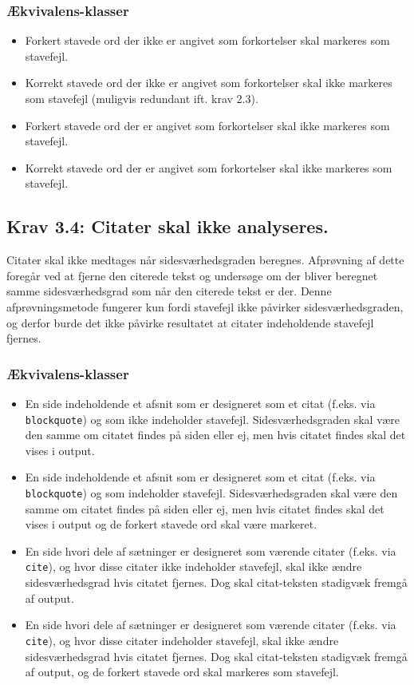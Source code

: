 \documentclass[a4paper,oneside,article]{memoir}
\begin{document}
\begin{landscape}
\subsubsection{Ækvivalens-klasser}
\begin{itemize}
\item Forkert stavede ord der ikke er angivet som forkortelser skal
  markeres som stavefejl.
\item Korrekt stavede ord der ikke er angivet som forkortelser skal
  ikke markeres som stavefejl (muligvis redundant ift. krav 2.3).
\item Forkert stavede ord der er angivet som forkortelser skal ikke
  markeres som stavefejl.
\item Korrekt stavede ord der er angivet som forkortelser skal ikke
  markeres som stavefejl.
\end{itemize}

\subsection{Krav 3.4: Citater skal ikke analyseres.}

Citater skal ikke medtages når sidesværhedsgraden beregnes. Afprøvning
af dette foregår ved at fjerne den citerede tekst og undersøge om der
bliver beregnet samme sidesværhedsgrad som når den citerede tekst er
der. Denne afprøvningsmetode fungerer kun fordi stavefejl ikke
påvirker sidesværhedsgraden, og derfor burde det ikke påvirke
resultatet at citater indeholdende stavefejl fjernes.

\subsubsection{Ækvivalens-klasser}
\begin{itemize}
\item En side indeholdende et afsnit som er designeret som et citat
  (f.eks. via \texttt{blockquote}) og som ikke indeholder
  stavefejl. Sidesværhedsgraden skal være den samme om citatet findes
  på siden eller ej, men hvis citatet findes skal det vises i output.
\item En side indeholdende et afsnit som er designeret som et citat
  (f.eks. via \texttt{blockquote}) og som indeholder
  stavefejl. Sidesværhedsgraden skal være den samme om citatet findes
  på siden eller ej, men hvis citatet findes skal det vises i output
  og de forkert stavede ord skal være markeret.
\item En side hvori dele af sætninger er designeret som værende
  citater (f.eks. via \texttt{cite}), og hvor disse citater ikke
  indeholder stavefejl, skal ikke ændre sidesværhedsgrad hvis citatet
  fjernes. Dog skal citat-teksten stadigvæk fremgå af output.
\item En side hvori dele af sætninger er designeret som værende
  citater (f.eks. via \texttt{cite}), og hvor disse citater indeholder
  stavefejl, skal ikke ændre sidesværhedsgrad hvis citatet
  fjernes. Dog skal citat-teksten stadigvæk fremgå af output, og de
  forkert stavede ord skal markeres som stavefejl.
\end{itemize}


\end{landscape}
\end{document}
